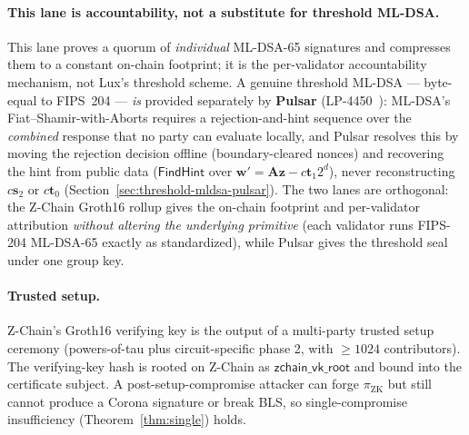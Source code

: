 \paragraph{This lane is accountability, not a substitute for threshold
ML-DSA.}
This lane proves a quorum of \emph{individual} ML-DSA-65 signatures and
compresses them to a constant on-chain footprint; it is the
per-validator accountability mechanism, not Lux's threshold scheme. A
genuine threshold ML-DSA --- byte-equal to FIPS~204 --- \emph{is}
provided separately by \textbf{Pulsar} (LP-4450~\cite{lp4450}):
ML-DSA's Fiat--Shamir-with-Aborts requires a rejection-and-hint
sequence over the \emph{combined} response that no party can evaluate
locally, and Pulsar resolves this by moving the rejection decision
offline (boundary-cleared nonces) and recovering the hint from public
data ($\mathsf{FindHint}$ over $\mathbf{w}' = \mathbf{A}\mathbf{z} -
c\mathbf{t}_1 2^d$), never reconstructing $c\mathbf{s}_2$ or
$c\mathbf{t}_0$ (Section~\ref{sec:threshold-mldsa-pulsar}).  The two
lanes are orthogonal: the Z-Chain Groth16 rollup gives the on-chain
footprint and per-validator attribution \emph{without altering the
underlying primitive} (each validator runs FIPS-204 ML-DSA-65 exactly
as standardized), while Pulsar gives the threshold seal under one group
key.

\paragraph{Trusted setup.}
Z-Chain's Groth16 verifying key is the output of a multi-party trusted
setup ceremony (powers-of-tau plus circuit-specific phase 2, with $\geq
1024$ contributors). The verifying-key hash is rooted on Z-Chain as
$\mathsf{zchain\_vk\_root}$ and bound into the certificate subject. A
post-setup-compromise attacker can forge $\pi_{\mathrm{ZK}}$ but still
cannot produce a Corona signature or break BLS, so single-compromise
insufficiency (Theorem~\ref{thm:single}) holds.


